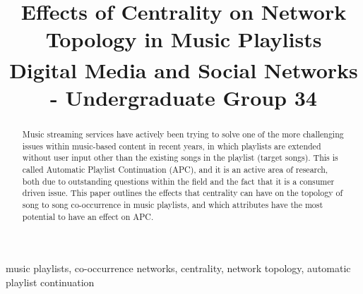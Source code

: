 \documentclass[conference]{IEEEtran}
\begin{document}
\title{Effects of Centrality on Network Topology in Music Playlists\\
{\footnotesize \textsuperscript{} Digital Media and Social Networks - Undergraduate Group 34}
}

\author{
\and
{}
\and
{}
\and
{}

}

\maketitle

\begin{abstract}
Music streaming services have actively been trying to solve one of the more challenging issues within music-based content in recent years, in which playlists are extended without user input other than the existing songs in the playlist (target songs). This is called Automatic Playlist Continuation (APC), and it is an active area of research, both due to outstanding questions within the field and the fact that it is a consumer driven issue. This paper outlines the effects that centrality can have on the topology of song to song co-occurrence in music playlists, and which attributes have the most potential to have an effect on APC.

\end{abstract}

\begin{IEEEkeywords}
music playlists, co-occurrence networks, centrality, network topology, automatic playlist continuation
\end{IEEEkeywords}
\end{document}
